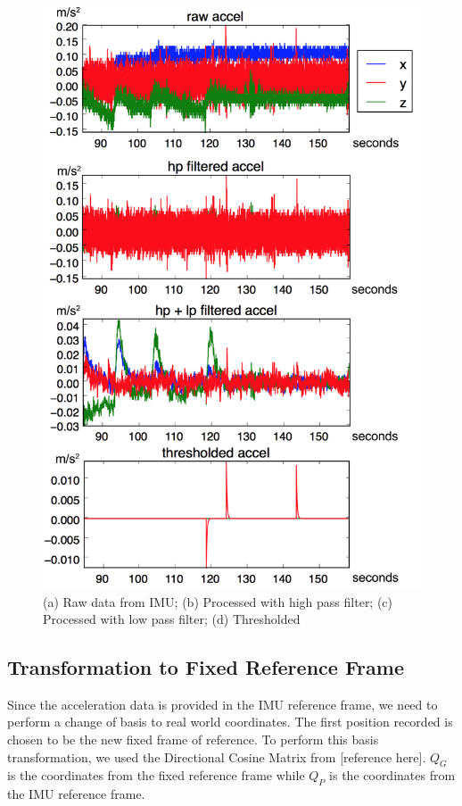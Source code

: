 \documentclass[12pt,journal]{IEEEtran}
\begin{document}
\begin{figure}[h]
  \centering
    \includegraphics[width=\linewidth]{figures/filtering}
  \caption{(a) Raw data from IMU; (b) Processed with high pass filter; (c) Processed with low pass filter; (d) Thresholded}
  \label{fig:filtering}
\end{figure}

\subsection{Transformation to Fixed Reference Frame}
  Since the acceleration data is provided in the IMU reference frame, we need to perform a change of basis to real world coordinates. The first position recorded is chosen to be the new fixed frame of reference. To perform this basis transformation, we used the Directional Cosine Matrix from [reference here]. $Q_G$ is the coordinates from the fixed reference frame while $Q_P$ is the coordinates from the IMU reference frame.
\end{document}
